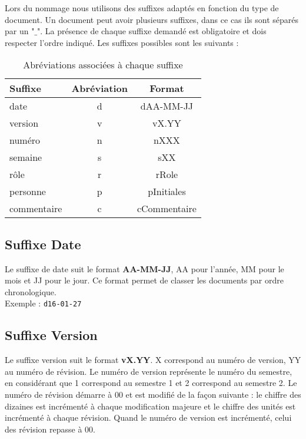 Lors du nommage nous utilisons des suffixes adaptés en fonction du type de document. Un document peut avoir plusieurs suffixes, dans ce cas ils sont séparés par un "$\_$". La présence de chaque suffixe demandé est obligatoire et dois respecter l'ordre indiqué. Les suffixes possibles sont les suivants : 

	\begin{table}[H]
		\centering
		\begin{tabularx}{10cm}{|X|c|c|}
		\hline
		\rowcolor[gray]{0.85} Suffixe & Abréviation & Format\\
		\hline
		date & d & dAA-MM-JJ\\
		\hline
		version & v & vX.YY\\
		\hline
		numéro & n & nXXX\\
		\hline
		semaine & s & sXX\\
		\hline
		rôle & r & rRole\\
		\hline
		personne & p & pInitiales\\
		\hline
		commentaire & c & cCommentaire\\
		\hline
		\end{tabularx}
	\caption{Abréviations associées à chaque suffixe}
	\label{Suffixes}
	\end{table}
	


\subsection{Suffixe Date}
\label{suffixe_date}

Le suffixe de date suit le format \textbf{AA-MM-JJ}, AA pour l'année, MM pour le mois et JJ pour le jour. Ce format permet de classer les documents par ordre chronologique.\\

Exemple : \verb+d16-01-27+

\subsection{Suffixe Version}
\label{suffixe_version}

Le suffixe version suit le format \textbf{vX.YY}. X correspond au numéro de version, YY au numéro de révision. Le numéro de version représente le numéro du semestre, en considérant que 1 correspond au semestre 1 et 2 correspond au semestre 2. Le numéro de révision démarre à 00 et est modifié de la façon suivante : le chiffre des dizaines est incrémenté à chaque modification majeure et le chiffre des unités est incrémenté à chaque révision. Quand le numéro de version est incrémenté, celui des révision repasse à 00.\\

